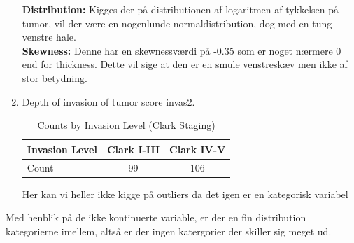 \begin{enumerate}
\textbf{Distribution:} Kigges der på distributionen af logaritmen af tykkelsen på tumor, vil der være en nogenlunde normaldistribution, dog med en tung venstre hale.\\
\textbf{Skewness:} Denne har en skewnessværdi på -0.35 som er noget nærmere 0 end for thickness. Dette vil sige at den er en smule venstreskæv men ikke af stor betydning.
\item Depth of invasion of tumor score invas2.
\begin{table}[h!]
    \centering
    \begin{tabular}{|l|c|c|}
        \hline
        Invasion Level & Clark I-III & Clark IV-V \\
        \hline
        Count & 99 & 106 \\
        \hline
    \end{tabular}
    \caption{Counts by Invasion Level (Clark Staging)}
    \label{tab:invasion_level}
\end{table}

Her kan vi heller ikke kigge på outliers da det igen er en kategorisk variabel
\end{enumerate}

Med henblik på de ikke kontinuerte variable, er der en fin distribution kategorierne imellem, altså er der ingen katergorier der skiller sig meget ud.

